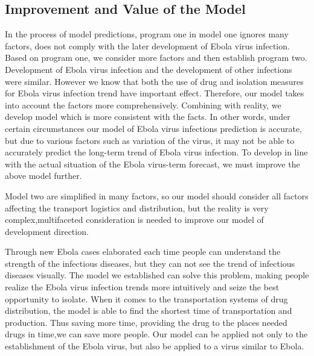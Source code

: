 \documentclass{icmmcm}
\begin{document}
\subsection{Improvement and Value of the Model}
In the process of model predictions, program one in model one
ignores many factors, does not comply with the later development
of Ebola virus infection. Based on program one, we consider more
factors and then establish program two. Development of Ebola
virus infection and the development of other infections were
similar. However we know that both the use of drug and isolation
measures for Ebola virus infection trend have important
effect. Therefore, our model takes into account the factors more
comprehensively. Combining with reality, we develop model which
is more consistent with the facts. In other words, under certain
circumstances our model of Ebola virus infections prediction is
accurate, but due to various factors such as variation of the
virus, it may not be able to accurately predict the long-term
trend of Ebola virus infection. To develop in line with the
actual situation of the Ebola virus-term forecast, we must
improve the above model further.
\par Model two are simplified in many factors, so our model
should consider all factors affecting the transport logistics
and distribution, but the reality is very complex,multifaceted
consideration is needed to improve our model of development
direction.
\par Through new Ebola cases elaborated each time people can
understand the strength of the infectious diseases, but they can
not see the trend of infectious diseases visually. The model we
established can solve this problem, making people realize the
Ebola virus infection trends more intuitively and seize the
best opportunity to isolate. When it comes to the transportation
systems of drug distribution, the model is able to find  the
shortest time of transportation and production. Thus saving more
time, providing the drug to the places needed drugs in time,we
can save more people. Our model can be applied not only to the
establishment of the Ebola virus, but also be applied to a virus
similar to Ebola.
\end{document}
